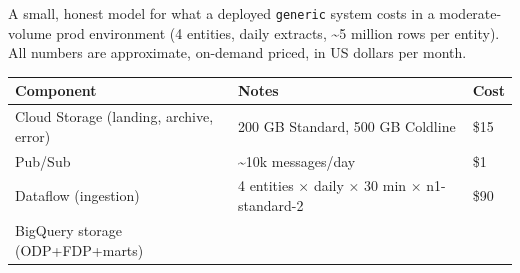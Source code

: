 \documentclass[
  11pt,
  british,
  oneside]{book}
\begin{document}
A small, honest model for what a deployed \texttt{generic} system costs
in a moderate-volume prod environment (4 entities, daily extracts,
\textasciitilde5 million rows per entity). All numbers are approximate,
on-demand priced, in US dollars per month.

\begin{longtable}[]{@{}lll@{}}
\toprule
\begin{minipage}[b]{0.30\columnwidth}\raggedright
Component\strut
\end{minipage} & \begin{minipage}[b]{0.30\columnwidth}\raggedright
Notes\strut
\end{minipage} & \begin{minipage}[b]{0.30\columnwidth}\raggedright
Cost\strut
\end{minipage}\tabularnewline
\midrule
\endhead
\begin{minipage}[t]{0.30\columnwidth}\raggedright
Cloud Storage (landing, archive, error)\strut
\end{minipage} & \begin{minipage}[t]{0.30\columnwidth}\raggedright
200 GB Standard, 500 GB Coldline\strut
\end{minipage} & \begin{minipage}[t]{0.30\columnwidth}\raggedright
\$15\strut
\end{minipage}\tabularnewline
\begin{minipage}[t]{0.30\columnwidth}\raggedright
Pub/Sub\strut
\end{minipage} & \begin{minipage}[t]{0.30\columnwidth}\raggedright
\textasciitilde10k messages/day\strut
\end{minipage} & \begin{minipage}[t]{0.30\columnwidth}\raggedright
\$1\strut
\end{minipage}\tabularnewline
\begin{minipage}[t]{0.30\columnwidth}\raggedright
Dataflow (ingestion)\strut
\end{minipage} & \begin{minipage}[t]{0.30\columnwidth}\raggedright
4 entities × daily × 30 min × n1-standard-2\strut
\end{minipage} & \begin{minipage}[t]{0.30\columnwidth}\raggedright
\$90\strut
\end{minipage}\tabularnewline
\begin{minipage}[t]{0.30\columnwidth}\raggedright
BigQuery storage (ODP+FDP+marts)\strut

\end{minipage}
\end{longtable}
\end{document}
